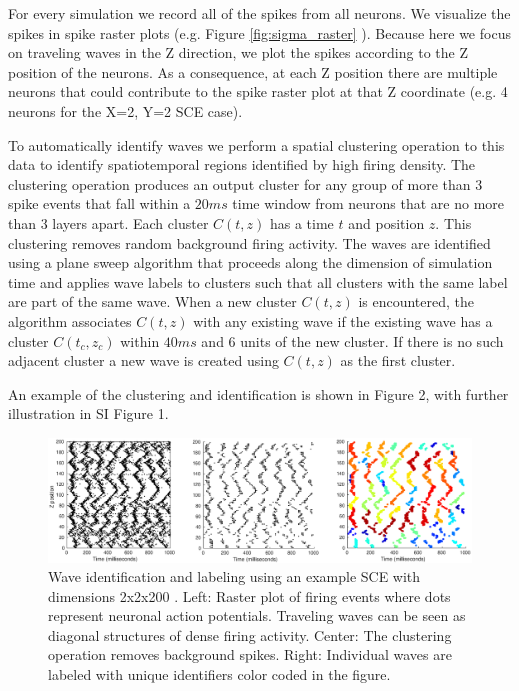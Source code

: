 For every simulation we record all of the spikes from all neurons. 
We visualize the spikes in spike raster plots (e.g. Figure \ref{fig:sigma_raster} ).
Because here we focus on traveling waves in the Z direction, we plot the spikes according to the Z position of the neurons.
As a consequence, at each Z position there are multiple neurons that could contribute to the spike raster plot at that Z coordinate (e.g. 4 neurons for the X=2, Y=2 SCE case).

To automatically identify waves we perform a spatial clustering operation to this data to identify spatiotemporal regions identified by high firing density. 
The clustering operation produces an output cluster for any group of more than $3$ spike events that fall within a $20ms$ time window from neurons that are no more than $3$ layers apart.
Each cluster $C(t,z)$ has a time $t$ and position $z$.
This clustering removes random background firing activity. 
The waves are identified using a plane sweep algorithm that proceeds along the dimension of simulation time and applies wave labels to clusters such that all clusters with the same label are part of the same wave.
When a new cluster $C(t,z)$ is encountered, the algorithm associates $C(t,z)$ with any existing wave if the existing wave has a cluster $C(t_c,z_c)$ within $40 ms$ and $6$ units of the new cluster.
If there is no such adjacent cluster a new wave is created using $C(t,z)$ as the first cluster.

An example of the clustering and identification is shown in Figure 2, with further illustration in SI Figure 1.
\begin{figure}[!htb]
  \centering
  \includegraphics[width=\textwidth]{fig/DetectorExample}
  \caption{Wave identification and labeling using an example SCE with dimensions 2x2x200 . Left: Raster plot of firing events where dots represent neuronal action potentials. 
	Traveling waves can be seen as diagonal structures of dense firing activity. 
	Center: The clustering operation removes background spikes. 
	Right: Individual waves are labeled with unique identifiers color coded in the figure.}
  \label{fig:wave_analysis}
\end{figure}

